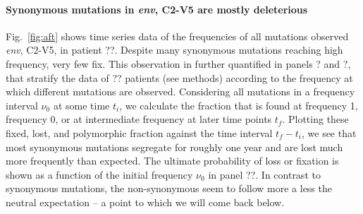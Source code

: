 \documentclass[rmp, twocolumn]{revtex4}
\newcommand{\env}{\textit{env}}
\newcommand{\FIG}[1]{Fig.~\ref{fig:#1}}
\begin{document}
\paragraph{Synonymous mutations in \env, C2-V5 are mostly deleterious}

\FIG{aft} shows time series data of the frequencies of all mutations observed \env, C2-V5, in patient ??\citep{shankarappa_consistent_1999,liu_selection_2006}. Despite many synonymous mutations reaching high frequency, very few fix. This observation in further quantified in panels ? and ?, that stratify the data of ?? patients (see methods) according to the frequency at which different mutations are observed. Considering all mutations in a frequency interval $\nu_0$ at some time $t_i$, we calculate the fraction that is found at frequency 1, frequency 0, or at intermediate frequency at later time points $t_f$. Plotting these fixed, lost, and polymorphic fraction against the time interval $t_f-t_i$, we see that most synonymous mutations segregate for roughly one year and are lost  much more frequently than expected. The ultimate probability of loss or fixation is shown as a function of the initial frequency $\nu_0$ in panel ??. In contrast to synonymous mutations, the non-synonymous seem to follow more a less the neutral expectation -- a point to which we will come back below. 
\end{document}
